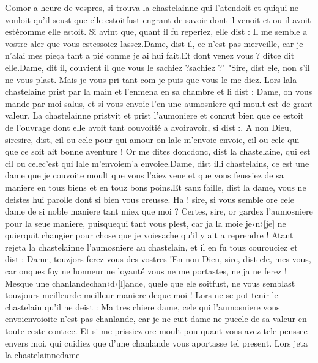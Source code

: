\documentclass{article}
\begin{document}
\begin{pages}
   Gomor a heure de vespres, si trouva la chastelainne 
   qui l’atendoit et quiqui ne vouloit qu’il seust que elle 
   estoitfust engrant de savoir dont il venoit 
   et ou il avoit estécomme elle estoit. 
   Si avint que, quant il fu reperiez, elle dist :
   Il me semble a vostre aler que vous estessoiez 
      lassez.Dame, dist il, ce n’est pas merveille, car je n’alai mes pieça tant a pié conme je ai hui fait.Et dont venez vous ? ditce dit elle.Dame, dit il, couvient il que vous le sachiez ?sachiez ?"
   "Sire, dist ele, non s'il ne vous plast. Mais je vous pri tant com je puis que vous le me diez.
   Lors lala chastelaine prist par la main et l’enmena en sa chambre et li dist :
   Dame, on vous mande par moi salus, et si vous envoie l’en une aumosniere qui moult est de grant valeur.
   La chastelainne pristvit et prist 
   l’aumoniere et connut bien que ce estoit de l’ouvrage dont elle avoit tant couvoitié a 
   avoiravoir, si dist :.
   A non Dieu, siresire, dist, 
      cil ou cele pour qui amour 
      on lale m’envoie
         envoie, cil ou cele qui que ce soit ait bonne aventure ! Or me dites 
      doncdonc, dist la chastelaine, qui 
      est cil ou celec'est 
      qui lale 
      m'envoiem’a envoiee.Dame, dist illi chastelains, 
      ce est une dame que je couvoite moult que vous l’aiez veue et 
         que vous feussiez de sa maniere en touz biens et en touz bons poins.Et sanz faille, dist la dame, vous ne deistes hui parolle 
      dont si bien vous creusse. Ha ! sire, si vous semble ore cele dame de si noble maniere tant miex 
      que moi ? Certes, sire, or gardez l’aumosniere pour la seue maniere, puisquequi 
      tant vous plest, car ja la moie je‹n›[je] ne 
      quierquit changier pour chose que je 
      voiesache qu’il y ait a reprendre ! \pend
\pstart Atant rejeta la chastelainne l’aumosniere au 
   chastelain, et il en fu touz courouciez et dist :
   Dame, touzjors ferez vous des vostres !En non Dieu, sire, dist ele, mes vous, car onques foy ne honneur ne loyauté vous ne me portastes, ne ja ne ferez ! 
      Mesque une 
      chanlandechan‹d›[l]ande, quele que ele 
      soitfust, ne vous semblast touzjours 
      meilleurde meilleur maniere 
      deque moi !
   Lors ne se pot tenir le chastelain qu’il ne deist :
   Ma tres chiere dame, 
      cele qui l’aumosniere vous 
         envoienvoioite n’est pas chanlande, 
   car je ne cuit dame ne pucele de sa valeur en toute ceste contree. Et si me prissiez ore moult pou quant vous avez tele penssee envers moi, 
   qui cuidiez que d’une chanlande vous aportasse tel present.
   Lors jeta la chastelainnedame 

\end{pages}
\end{document}
